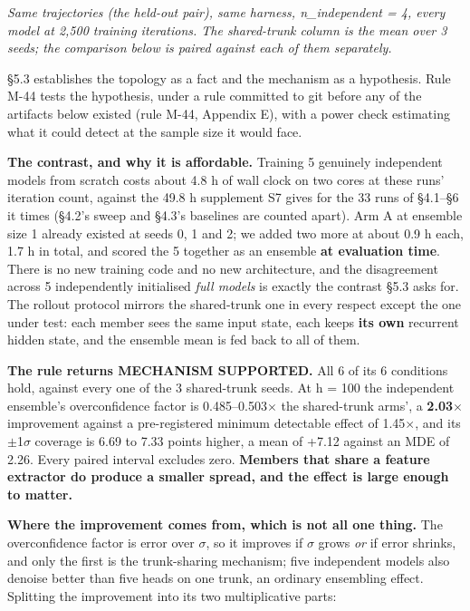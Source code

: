 \documentclass[10pt]{article}
\begin{document}
\emph{Same trajectories (the held-out pair), same harness, n\_independent = 4, every model at 2,500 training iterations. The shared-trunk column is the mean over 3 seeds; the comparison below is paired against each of them separately.}

\S{}5.3 establishes the topology as a fact and the mechanism as a hypothesis. Rule M-44 tests the hypothesis, under a rule committed to git before any of the artifacts below existed (rule M-44, Appendix E), with a power check estimating what it could detect at the sample size it would face.

\textbf{The contrast, and why it is affordable.} Training 5 genuinely independent models from scratch costs about 4.8 h of wall clock on two cores at these runs' iteration count, against the 49.8 h supplement S7 gives for the 33 runs of \S{}4.1--\S{}6 it times (\S{}4.2's sweep and \S{}4.3's baselines are counted apart). Arm A at ensemble size 1 already existed at seeds 0, 1 and 2; we added two more at about 0.9 h each, 1.7 h in total, and scored the 5 together as an ensemble \textbf{at evaluation time}. There is no new training code and no new architecture, and the disagreement across 5 independently initialised \emph{full models} is exactly the contrast \S{}5.3 asks for. The rollout protocol mirrors the shared-trunk one in every respect except the one under test: each member sees the same input state, each keeps \textbf{its own} recurrent hidden state, and the ensemble mean is fed back to all of them.

\textbf{The rule returns MECHANISM SUPPORTED.} All 6 of its 6 conditions hold, against every one of the 3 shared-trunk seeds. At h = 100 the independent ensemble's overconfidence factor is 0.485--0.503$\times$ the shared-trunk arms', a \textbf{2.03$\times$} improvement against a pre-registered minimum detectable effect of 1.45$\times$, and its $\pm$1$\sigma$ coverage is 6.69 to 7.33 points higher, a mean of +7.12 against an MDE of 2.26. Every paired interval excludes zero. \textbf{Members that share a feature extractor do produce a smaller spread, and the effect is large enough to matter.}

\textbf{Where the improvement comes from, which is not all one thing.} The overconfidence factor is error over $\sigma$, so it improves if $\sigma$ grows \emph{or} if error shrinks, and only the first is the trunk-sharing mechanism; five independent models also denoise better than five heads on one trunk, an ordinary ensembling effect. Splitting the improvement into its two multiplicative parts:
\end{document}
